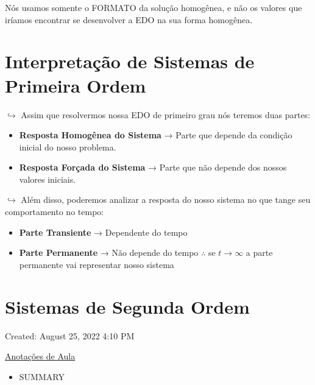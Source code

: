 \documentclass[]{article}
\providecommand{\tightlist}{%
  \setlength{\itemsep}{0pt}\setlength{\parskip}{0pt}}
\begin{document}
  Nós usamos somente o FORMATO da solução homogênea, e não os valores que
  iríamos encontrar se desenvolver a EDO na sua forma homogênea.

  \hypertarget{interpretauxe7uxe3o-de-sistemas-de-primeira-ordem}{%
  \section{Interpretação de Sistemas de Primeira
  Ordem}\label{interpretauxe7uxe3o-de-sistemas-de-primeira-ordem}}

  \(\hookrightarrow\) Assim que resolvermos nossa EDO de primeiro grau nós
  teremos duas partes:

  \begin{itemize}
  \tightlist
  \item
    \textbf{Resposta Homogênea do Sistema} → Parte que depende da condição
    inicial do nosso problema.
  \item
    \textbf{Resposta Forçada do Sistema} → Parte que não depende dos
    nossos valores iniciais.
  \end{itemize}

  \(\hookrightarrow\) Além disso, poderemos analizar a resposta do nosso
  sistema no que tange seu comportamento no tempo:

  \begin{itemize}
  \tightlist
  \item
    \textbf{Parte Transiente} → Dependente do tempo
  \item
    \textbf{Parte Permanente} → Não depende do tempo \(\therefore\) se
    \(t \rightarrow \infty\) a parte permanente vai representar nosso
    sistema
  \end{itemize}

  \hypertarget{sistemas-de-segunda-ordem}{%
  \section{Sistemas de Segunda Ordem}\label{sistemas-de-segunda-ordem}}

  Created: August 25, 2022 4:10 PM

  \href{Sistemas\%20de\%20Segunda\%20Ordem\%207cce407b38fb4322a04efbceb4baea55/Anotac\%CC\%A7o\%CC\%83es\%20de\%20Aula\%20f1f42d977d6e4b859d420fff2fed867d.md}{Anotações
  de Aula}

  \begin{itemize}
  \tightlist
  \item
    SUMMARY
  \end{itemize}
\end{document}
